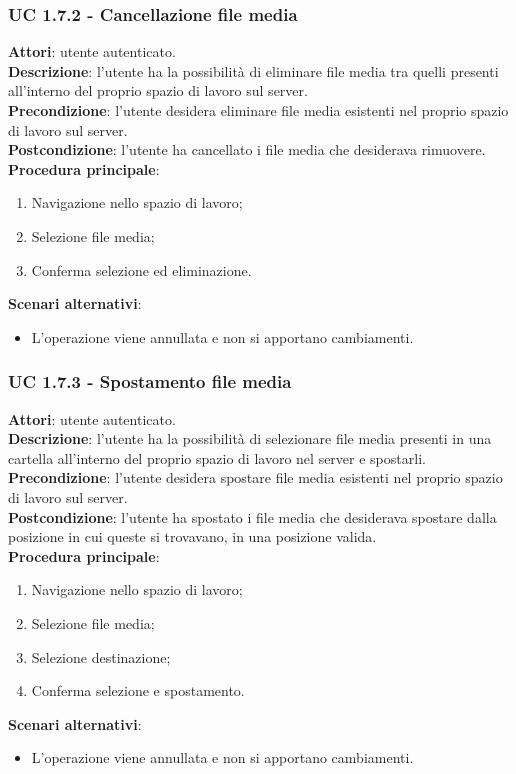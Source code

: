 	\subsubsection{UC 1.7.2 - Cancellazione file media}{
		\label{uc1.7.2}
		\textbf{Attori}: utente autenticato.	\\
		\textbf{Descrizione}: l'utente ha la possibilità di eliminare file media tra quelli presenti all'interno del proprio spazio di lavoro sul server. \\
		\textbf{Precondizione}: l'utente desidera eliminare file media esistenti nel proprio spazio di lavoro sul server.	\\
		\textbf{Postcondizione}: l'utente ha cancellato i file media che desiderava rimuovere.	\\
		\textbf{Procedura principale}:
		\begin{enumerate}
			\item Navigazione nello spazio di lavoro;
			\item Selezione file media;
			\item Conferma selezione ed eliminazione.
		\end{enumerate}
		\textbf{Scenari alternativi}: 
		\begin{itemize}
			\item L'operazione viene annullata e non si apportano cambiamenti.
		\end{itemize}
		}
	\subsubsection{UC 1.7.3 - Spostamento file media}{
		\label{uc1.7.3}
		\textbf{Attori}: utente autenticato.	\\
		\textbf{Descrizione}: l'utente ha la possibilità di selezionare file media presenti in una cartella all'interno del proprio spazio di lavoro nel server e spostarli. \\
		\textbf{Precondizione}: l'utente desidera spostare file media esistenti nel proprio spazio di lavoro sul server.	\\
		\textbf{Postcondizione}: l'utente ha spostato i file media che desiderava spostare dalla posizione in cui queste si trovavano, in una posizione valida.	\\
		\textbf{Procedura principale}:
		\begin{enumerate}
			\item Navigazione nello spazio di lavoro;
			\item Selezione file media;
			\item Selezione destinazione;
			\item Conferma selezione e spostamento.
		\end{enumerate}
		\textbf{Scenari alternativi}: 
		\begin{itemize}
			\item L'operazione viene annullata e non si apportano cambiamenti.
		\end{itemize}
		}
